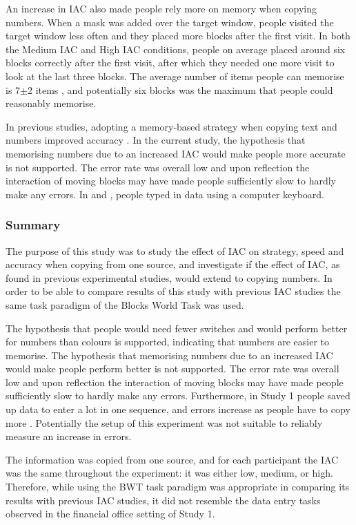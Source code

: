 \documentclass[11pt,oneside]{report}
\begin{document}
\begin{table}
An increase in IAC also made people rely more on memory when copying numbers. When a mask was added over the target window, people visited the target window less often and they placed more blocks after the first visit. In both the Medium IAC and High IAC conditions, people on average placed around six blocks correctly after the first visit, after which they needed one more visit to look at the last three blocks. The average number of items people can memorise is 7$\pm$2 items \citep{Miller1956}, and potentially six blocks was the maximum that people could reasonably memorise.

In previous studies, adopting a memory-based strategy when copying text and numbers improved accuracy \citep{Gray2004, Soboczenski2013}. In the current study, the hypothesis that memorising numbers due to an increased IAC would make people more accurate is not supported. 
The error rate was overall low and upon reflection the interaction of moving blocks may have made people sufficiently slow to hardly make any errors. In \citet{Gray2004} and \citet{Soboczenski2013}, people typed in data using a computer keyboard.

\subsubsection{Summary}
The purpose of this study was to study the effect of IAC on strategy, speed and accuracy when copying from one source, and investigate if the effect of IAC, as found in previous experimental studies, would extend to copying numbers. In order to be able to compare results of this study with previous IAC studies the same task paradigm of the Blocks World Task was used.

The hypothesis that people would need fewer switches and would perform better for numbers than colours is supported, indicating that numbers are easier to memorise. The hypothesis that memorising numbers due to an increased IAC would make people perform better is not supported. The error rate was overall low and upon reflection the interaction of moving blocks may have made people sufficiently slow to hardly make any errors. Furthermore, in Study 1 people saved up data to enter a lot in one sequence, and errors increase as people have to copy more \citep{Healy2004}. Potentially the setup of this experiment was not suitable to reliably measure an increase in errors.
 
The information was copied from one source, and for each participant the IAC was the same throughout the experiment: it was either low, medium, or high. Therefore, while using the BWT task paradigm was appropriate in comparing its results with previous IAC studies, it did not resemble the data entry tasks observed in the financial office setting of Study 1. 


\end{table}
\end{document}
